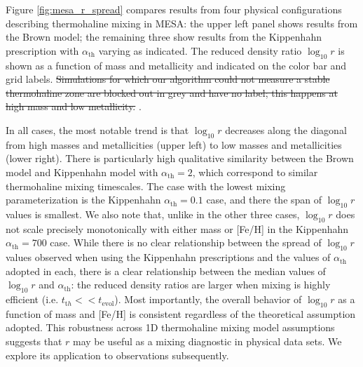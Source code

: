 %
%
Figure \ref{fig:mesa_r_spread} compares results from four physical configurations describing thermohaline mixing in MESA: the upper left panel shows results from the Brown model; the remaining three show results from the Kippenhahn prescription with $\alpha_{\text{th}}$ varying as indicated. The reduced density ratio $\log_{10} r$ is shown as a function of mass and metallicity and indicated on the color bar and grid labels.
\sout{Simulations for which our algorithm could not measure a stable thermohaline zone are blocked out in grey and have no label; this happens at high mass and low metallicity.} .
%

In all cases, the most notable trend is that $\log_{10} r$ decreases along the diagonal from high masses and metallicities (upper left) to low masses and metallicities (lower right). There is particularly high qualitative similarity between the Brown model and Kippenhahn model with $\alpha_{\text{th}} = 2$, which correspond to similar thermohaline mixing timescales. The case with the lowest mixing parameterization is the Kippenhahn $\alpha_{\text{th}} = 0.1$ case, and there the span of $\log_{10} r$ values is smallest. We also note that, unlike in the other three cases, $\log_{10} r$ does not scale precisely monotonically with either mass or [Fe/H] in the Kippenhahn $\alpha_{\text{th}} = 700$ case. While there is no clear relationship between the spread of $\log_{10} r$ values observed when using the Kippenhahn prescriptions and the values of $\alpha_{\text{th}}$ adopted in each, there is a clear relationship between the median values of $\log_{10} r$ and $\alpha_{\text{th}}$: the reduced density ratios are larger  when mixing is highly efficient (i.e. $t_{\mathrm th} << t_{\text{evol}}$). 
Most importantly, the overall behavior of $\log_{10} r$ as a function of mass and [Fe/H] is consistent regardless of the theoretical assumption adopted.
%
This robustness across 1D thermohaline mixing model assumptions suggests that $r$ may be useful as a mixing diagnostic in physical data sets. We explore its application to observations subsequently.


